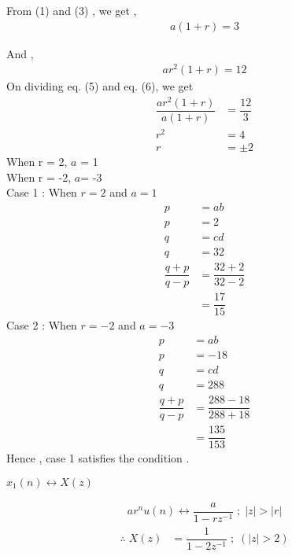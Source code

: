 \documentclass[journal,12pt,twocolumn]{IEEEtran}
\theoremstyle{remark}
\begin{document}
From (1) and (3) , we get , 
\begin{align}
a(1+r)=3
\end{align}
 
 And ,
 \begin{align}
ar^{2}(1+r) = 12
\end{align}
On dividing eq. (5) and eq. (6), we get
\begin{align}
\dfrac{ar^{2}(1+r)}{a(1+r)} &= \dfrac{12}{3} \\
r^{2} &= 4 \\
r &= \pm2
\end{align}
When r = 2, $a$ = 1 \\
When r = -2, $a$= -3 \\
Case 1 :
When $r = 2$ and $a = 1$ \\
\begin{align}
p &= ab\\
p&=2 \\
q&= cd \\
q&=32 \\
\dfrac{q+p}{q-p} &= \dfrac{32 + 2}{32 - 2} \\
&=\dfrac{17}{15}
\end{align}
Case 2 :
When $r = -2$ and $a = -3$ \\
\begin{align}
p &= ab\\
p&=-18 \\
q&= cd \\
q&=288 \\
\dfrac{q+p}{q-p} &= \dfrac{288-18}{288+18} \\
&=\dfrac{135}{153}
\end{align}
Hence , case 1 satisfies the condition .
\begin{center}
 $x_1(n) \longleftrightarrow X(z)$
\end{center}
 \begin{align}
ar^{n}u(n)  \longleftrightarrow  \dfrac{a}{1 - rz^{-1}} \; ; \; |z| > |r| 
 \end{align}
  \begin{align}
\therefore \; X(z) &= \dfrac{1}{1 - 2z^{-1}} \; ; \;( |z| > 2 )
 \end{align}
\end{document}
